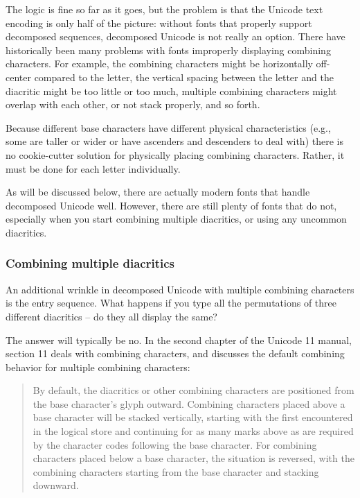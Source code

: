 \documentclass[11pt]{article}
\begin{document}
The logic is fine so far as it goes, but the problem is that the Unicode text encoding is only half of the picture: without fonts that properly support decomposed sequences, decomposed Unicode is not really an option. There have historically been many problems with fonts improperly displaying combining characters. For example, the combining characters might be horizontally off-center compared to the letter, the vertical spacing between the letter and the diacritic might be too little or too much, multiple combining characters might overlap with each other, or not stack properly, and so forth.

Because different base characters have different physical characteristics (e.g., some are taller or wider or have ascenders and descenders to deal with) there is no cookie-cutter solution for physically placing combining characters. Rather, it must be done for each letter individually.

As will be discussed below, there are actually modern fonts that handle decomposed Unicode well. However, there are still plenty of fonts that do not, especially when you start combining multiple diacritics, or using any uncommon diacritics.

\subsubsection{Combining multiple diacritics}
\label{sec:org8c1f76c}

An additional wrinkle in decomposed Unicode with multiple combining characters is the entry sequence. What happens if you type all the permutations of three different diacritics -- do they all display the same?

The answer will typically be no. In the second chapter of the Unicode 11 manual, section 11 deals with combining characters, and discusses the default combining behavior for multiple combining characters:

\begin{quote}
By default, the diacritics or other combining characters are positioned from the base character’s glyph outward. Combining characters placed above a base character will be stacked vertically, starting with the first encountered in the logical store and continuing for as many marks above as are required by the character codes following the base character. For combining characters placed below a base character, the situation is reversed, with the combining characters
starting from the base character and stacking downward.
\end{quote}
\end{document}
